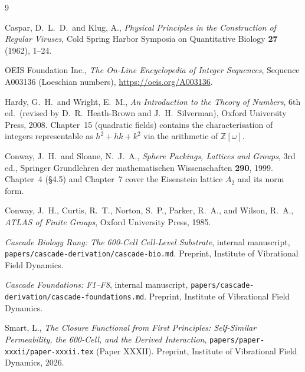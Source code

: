 \documentclass[12pt]{article}
\begin{document}
\begin{thebibliography}{9}

Caspar, D.~L.~D.\ and Klug, A.,
\emph{Physical Principles in the Construction of Regular Viruses},
Cold Spring Harbor Symposia on Quantitative Biology \textbf{27}
(1962), 1--24.

OEIS Foundation Inc.,
\emph{The On-Line Encyclopedia of Integer Sequences}, Sequence
A003136 (Loeschian numbers), \url{https://oeis.org/A003136}.

Hardy, G.~H.\ and Wright, E.~M.,
\emph{An Introduction to the Theory of Numbers}, 6th ed.\ (revised
by D.~R.~Heath-Brown and J.~H.~Silverman), Oxford University
Press, 2008. Chapter~15 (quadratic fields) contains the
characterisation of integers representable as $h^2 + hk + k^2$ via
the arithmetic of $\mathbb{Z}[\omega]$.

Conway, J.~H.\ and Sloane, N.~J.~A.,
\emph{Sphere Packings, Lattices and Groups}, 3rd ed., Springer
Grundlehren der mathematischen Wissenschaften \textbf{290}, 1999.
Chapter~4 (§4.5) and Chapter~7 cover the Eisenstein lattice $A_2$
and its norm form.

Conway, J.~H., Curtis, R.~T., Norton, S.~P., Parker, R.~A., and
Wilson, R.~A.,
\emph{ATLAS of Finite Groups}, Oxford University Press, 1985.

\emph{Cascade Biology Rung: The 600-Cell Cell-Level Substrate},
internal manuscript,
\texttt{papers/cascade-derivation/cascade-bio.md}. Preprint, Institute
of Vibrational Field Dynamics.

\emph{Cascade Foundations: F1--F8}, internal manuscript,
\texttt{papers/cascade-derivation/cascade-foundations.md}. Preprint,
Institute of Vibrational Field Dynamics.

Smart, L.,
\emph{The Closure Functional from First Principles: Self-Similar
Permeability, the 600-Cell, and the Derived Interaction},
\texttt{papers/paper-xxxii/paper-xxxii.tex} (Paper XXXII).
Preprint, Institute of Vibrational Field Dynamics, 2026.

\end{thebibliography}
\end{document}
